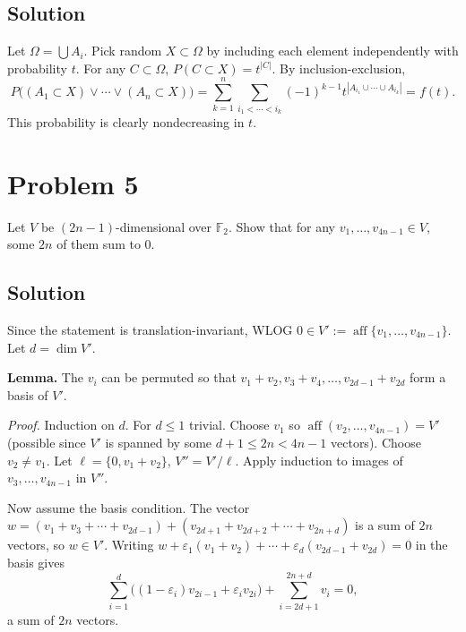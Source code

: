 \documentclass{article}
\begin{document}
\subsection*{Solution}
Let $\Omega = \bigcup A_i$. Pick random $X \subset \Omega$ by including each element independently with probability $t$. For any $C \subset \Omega$, $P(C \subset X) = t^{|C|}$. By inclusion-exclusion,
\[
P\bigl( (A_1 \subset X) \lor \cdots \lor (A_n \subset X) \bigr) = \sum_{k=1}^n \sum_{i_1 < \cdots < i_k} (-1)^{k-1} t^{|A_{i_1} \cup \cdots \cup A_{i_k}|} = f(t).
\]
This probability is clearly nondecreasing in $t$.

\section*{Problem 5}
Let $V$ be $(2n-1)$-dimensional over $\mathbb{F}_2$. Show that for any $v_1, \ldots, v_{4n-1} \in V$, some $2n$ of them sum to $0$.

\subsection*{Solution}
Since the statement is translation-invariant, WLOG $0 \in V' := \operatorname{aff}\{v_1, \ldots, v_{4n-1}\}$. Let $d = \dim V'$.

\textbf{Lemma.} The $v_i$ can be permuted so that $v_1 + v_2, v_3 + v_4, \ldots, v_{2d-1} + v_{2d}$ form a basis of $V'$.

\emph{Proof.} Induction on $d$. For $d \le 1$ trivial. Choose $v_1$ so $\operatorname{aff}(v_2, \ldots, v_{4n-1}) = V'$ (possible since $V'$ is spanned by some $d+1 \le 2n < 4n - 1$ vectors). Choose $v_2 \ne v_1$. Let $\ell = \{0, v_1 + v_2\}$, $V'' = V'/\ell$. Apply induction to images of $v_3, \ldots, v_{4n-1}$ in $V''$.

Now assume the basis condition. The vector $w = (v_1 + v_3 + \cdots + v_{2d-1}) + (v_{2d+1} + v_{2d+2} + \cdots + v_{2n+d})$ is a sum of $2n$ vectors, so $w \in V'$. Writing $w + \varepsilon_1(v_1 + v_2) + \cdots + \varepsilon_d(v_{2d-1} + v_{2d}) = 0$ in the basis gives
\[
\sum_{i=1}^d \bigl( (1-\varepsilon_i) v_{2i-1} + \varepsilon_i v_{2i} \bigr) + \sum_{i=2d+1}^{2n+d} v_i = 0,
\]
a sum of $2n$ vectors.
\end{document}
